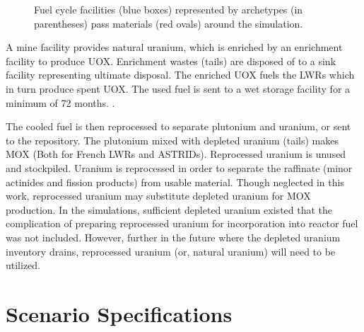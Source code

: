 \begin{figure}
{
        
                }
                \caption{Fuel cycle facilities (blue boxes) represented by 
                        \Cyclus archetypes (in parentheses) pass materials (red 
                ovals) around the simulation.} 
                \label{diag:fc}
\end{figure}

A mine facility provides natural uranium, which is enriched by an enrichment
facility to produce \gls{UOX}. Enrichment wastes (tails) are disposed of to a 
sink facility representing ultimate disposal. The enriched \gls{UOX} fuels
the \glspl{LWR} which in turn produce spent \gls{UOX}. The used fuel
is sent to a wet storage facility for a minimum of 72 months. \cite{carre_overview_2009}.

The cooled fuel is then reprocessed to separate plutonium and uranium,
or sent to the repository.
The plutonium mixed with depleted uranium (tails) makes \gls{MOX} (Both for
French \glspl{LWR} and \glspl{ASTRID}).
Reprocessed uranium is unused and stockpiled. Uranium is reprocessed
in order to separate the raffinate (minor actinides and fission products)
from usable material. Though neglected in this work, reprocessed
uranium may substitute depleted uranium for \gls{MOX} production. In the
simulations, sufficient depleted uranium existed that the complication of
preparing reprocessed uranium for incorporation into reactor fuel
was not included. However, further in the future where the depleted
uranium inventory drains, reprocessed uranium (or, natural uranium) will need to be utilized. 

\FloatBarrier

\section{Scenario Specifications}

